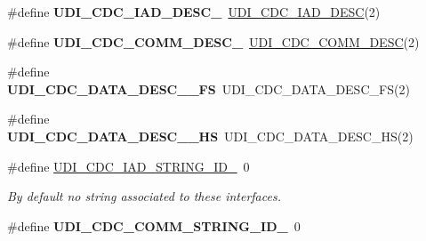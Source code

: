 \begin{DoxyCompactItemize}
\item 
\hypertarget{group__udi__cdc__group__desc_gaddcfb95d048052be48473080227083b0}{\#define {\bfseries U\-D\-I\-\_\-\-C\-D\-C\-\_\-\-I\-A\-D\-\_\-\-D\-E\-S\-C\-\_}~\hyperlink{group__udi__cdc__group__desc_ga39928ecb0423aff5f7ab70ae98eb2c94}{U\-D\-I\-\_\-\-C\-D\-C\-\_\-\-I\-A\-D\-\_\-\-D\-E\-S\-C}(2)}\label{group__udi__cdc__group__desc_gaddcfb95d048052be48473080227083b0}

\item 
\hypertarget{group__udi__cdc__group__desc_gad0037f6d45bce6eb8134fab5a0bda97d}{\#define {\bfseries U\-D\-I\-\_\-\-C\-D\-C\-\_\-\-C\-O\-M\-M\-\_\-\-D\-E\-S\-C\-\_}~\hyperlink{group__udi__cdc__group__desc_gac76fc1207bccd36e9851945206c063c0}{U\-D\-I\-\_\-\-C\-D\-C\-\_\-\-C\-O\-M\-M\-\_\-\-D\-E\-S\-C}(2)}\label{group__udi__cdc__group__desc_gad0037f6d45bce6eb8134fab5a0bda97d}

\item 
\hypertarget{group__udi__cdc__group__desc_ga05789c247fb890f81c40816796cbeb3d}{\#define {\bfseries U\-D\-I\-\_\-\-C\-D\-C\-\_\-\-D\-A\-T\-A\-\_\-\-D\-E\-S\-C\-\_\-\_\-\-F\-S}~U\-D\-I\-\_\-\-C\-D\-C\-\_\-\-D\-A\-T\-A\-\_\-\-D\-E\-S\-C\-\_\-\-F\-S(2)}\label{group__udi__cdc__group__desc_ga05789c247fb890f81c40816796cbeb3d}

\item 
\hypertarget{group__udi__cdc__group__desc_ga0640e1ff59c9490a08ba10e4326a09d2}{\#define {\bfseries U\-D\-I\-\_\-\-C\-D\-C\-\_\-\-D\-A\-T\-A\-\_\-\-D\-E\-S\-C\-\_\-\_\-\-H\-S}~U\-D\-I\-\_\-\-C\-D\-C\-\_\-\-D\-A\-T\-A\-\_\-\-D\-E\-S\-C\-\_\-\-H\-S(2)}\label{group__udi__cdc__group__desc_ga0640e1ff59c9490a08ba10e4326a09d2}

\item 
\hypertarget{group__udi__cdc__group__desc_ga2c8160b1671a3a43bb693a828ed4d16d}{\#define \hyperlink{group__udi__cdc__group__desc_ga2c8160b1671a3a43bb693a828ed4d16d}{U\-D\-I\-\_\-\-C\-D\-C\-\_\-\-I\-A\-D\-\_\-\-S\-T\-R\-I\-N\-G\-\_\-\-I\-D\-\_}~0}\label{group__udi__cdc__group__desc_ga2c8160b1671a3a43bb693a828ed4d16d}

\begin{DoxyCompactList}\small\item\em By default no string associated to these interfaces. \end{DoxyCompactList}\item 
\hypertarget{group__udi__cdc__group__desc_ga7d560c010b311f1bee2d8f40abf64171}{\#define {\bfseries U\-D\-I\-\_\-\-C\-D\-C\-\_\-\-C\-O\-M\-M\-\_\-\-S\-T\-R\-I\-N\-G\-\_\-\-I\-D\-\_}~0}\label{group__udi__cdc__group__desc_ga7d560c010b311f1bee2d8f40abf64171}


\end{DoxyCompactItemize}
